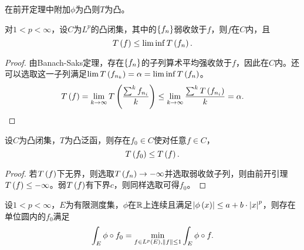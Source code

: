\documentclass{ctexrep}
\begin{document}
  \begin{ex}
  在前开定理中附加$\phi$为凸则$T$为凸。
  \end{ex}
  \begin{lemma}
  对$1<p<\infty$，设$C$为$L^p$的凸闭集，其中的$\left\{f_n\right\}$弱收敛于$f$，则$f$在$C$内，且
  \[ T\left(f\right) \le \lim\inf T\left(f_n\right). \]
  \end{lemma}
  \begin{proof}
  由Banach-Saks定理，存在$\left\{f_n\right\}$的子列算术平均强收敛于$f$，因此在$C$内。还可以选取这一子列满足$\lim T\left(f_{n_k}\right) = \alpha = \lim\inf T\left(f_n\right)$。
  \[ T\left(f\right) = \lim_{k\rightarrow \infty} T\left(\frac{\sum^k f_{n_i}}{k}\right) \le \lim_{k\rightarrow \infty}\frac{\sum^k T\left(f_{n_i}\right)}{k} = \alpha. \qedhere\]
  \end{proof}
  \begin{theorem}
  设$C$为凸闭集，$T$为凸泛函，则存在$f_0\in C$使对任意$f\in C$，
  \[ T\left(f_0\right)\le T\left(f\right). \]
  \end{theorem}
  \begin{proof}
  若$T\left(f\right)$下无界，则选取$T\left(f_n\right)\rightarrow -\infty$并选取弱收敛子列，则由前开引理$T\left(f\right) \le -\infty$。弱$T\left(f\right)$有下界$c$，则同样选取可得$f_0$。
  \end{proof}
  \begin{collary}
  设$1<p<\infty$，$E$为有限测度集，$\phi$在$\mathbb{R}$上连续且满足$\abs{\phi\left(x\right)} \le a+b\cdot\abs{x}^p$，则存在单位圆内的$f_0$满足
  \[ \int_E \phi\circ f_0 = \min_{f\in L^p\left(E\right), \norm{f}\le 1} \int_E \phi\circ f. \]
  \end{collary}
 
\ifx\allfiles\undefined %
\end{document}
